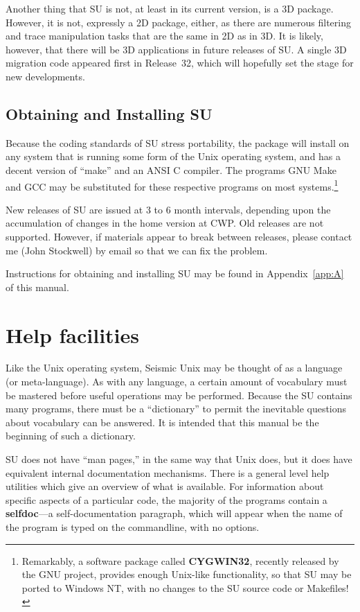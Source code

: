 Another thing that SU is not, at least in its current version,
is a 3D package. However, it is not, expressly a 2D package, either,
as there are numerous filtering and trace manipulation tasks that
are the same in 2D as in 3D. It is likely, however, that there will
be 3D applications in future releases of SU. A single 3D migration
code appeared first in Release~32, which will hopefully set the
stage for new developments.

\section{Obtaining and Installing SU}

Because the coding standards of SU stress portability, the
package will install on any system that is running some form
of the Unix operating system, and has a decent version of ``make''
and an ANSI C compiler.
The programs GNU Make and GCC may be substituted for these respective
programs on most systems.\footnote{Remarkably, a software package called
{\bf CYGWIN32}, recently released by the GNU project, provides enough
Unix-like functionality, so that SU may be ported to Windows NT, 
with no changes to the SU source code or Makefiles!}

New releases of SU are issued at 3 to 6 month intervals, depending
upon the accumulation of changes in the home version at CWP.
Old releases are not supported. However, if materials appear to break
between releases, please contact me (John Stockwell) by email
so that we can fix the problem.

Instructions for obtaining and installing SU may be found in
Appendix~\ref{app:A} of this manual.

\chapter{Help facilities}

Like the Unix operating system, Seismic Unix may be thought of
as a language (or meta-language). As with any language, a certain 
amount of vocabulary must be mastered before useful operations may be
performed.
Because the SU contains many programs,
there must be a ``dictionary'' to permit the inevitable
questions about vocabulary can be answered.
It is intended that this manual be the beginning of such a dictionary.

SU does not have ``man pages,'' in the same way that
Unix does, but it does have equivalent internal documentation
mechanisms.
There is a general level help utilities which give an
overview of what is available.
For information about specific aspects of a particular code,
the majority of the programs contain a {\bf selfdoc}---a
self-documentation paragraph, which will appear when the name
of the program is typed on the commandline, with no options.

